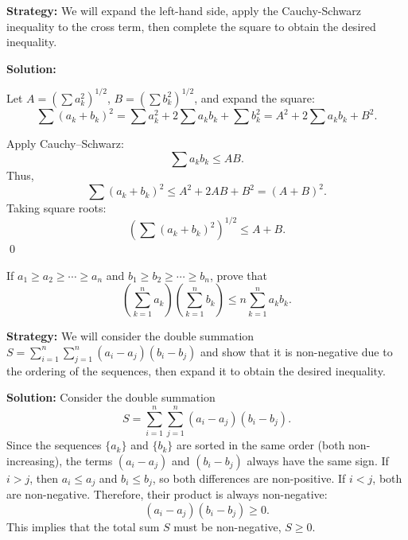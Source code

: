 \noindent\textbf{Strategy:} We will expand the left-hand side, apply the Cauchy-Schwarz inequality to the cross term, then complete the square to obtain the desired inequality.

\bigskip\noindent\textbf{Solution:}

Let \( A = \left( \sum a_k^2 \right)^{1/2} \), \( B = \left( \sum b_k^2 \right)^{1/2} \), and expand the square:
\[
\sum (a_k + b_k)^2 = \sum a_k^2 + 2\sum a_k b_k + \sum b_k^2 = A^2 + 2\sum a_k b_k + B^2.
\]

Apply Cauchy–Schwarz:
\[
\sum a_k b_k \leq A B.
\]
Thus,
\[
\sum (a_k + b_k)^2 \leq A^2 + 2AB + B^2 = (A + B)^2.
\]
Taking square roots:
\[
\left( \sum (a_k + b_k)^2 \right)^{1/2} \leq A + B.
\]\qed


\begin{problembox}
\begin{problemstatement}
If \( a_1 \geq a_2 \geq \cdots \geq a_n \) and \( b_1 \geq b_2 \geq \cdots \geq b_n \), prove that
\[
\left( \sum_{k=1}^n a_k \right)\left( \sum_{k=1}^n b_k \right) \leq n \sum_{k=1}^n a_k b_k.
\]
\end{problemstatement}
\end{problembox}

\noindent\textbf{Strategy:} We will consider the double summation $S = \sum_{i=1}^n \sum_{j=1}^n (a_i - a_j)(b_i - b_j)$ and show that it is non-negative due to the ordering of the sequences, then expand it to obtain the desired inequality.

\bigskip\noindent\textbf{Solution:}
Consider the double summation
\[ S = \sum_{i=1}^n \sum_{j=1}^n (a_i - a_j)(b_i - b_j). \]
Since the sequences $\{a_k\}$ and $\{b_k\}$ are sorted in the same order (both non-increasing), the terms $(a_i - a_j)$ and $(b_i - b_j)$ always have the same sign. If $i>j$, then $a_i \le a_j$ and $b_i \le b_j$, so both differences are non-positive. If $i<j$, both are non-negative. Therefore, their product is always non-negative:
\[ (a_i - a_j)(b_i - b_j) \geq 0. \]
This implies that the total sum $S$ must be non-negative, $S \geq 0$.

